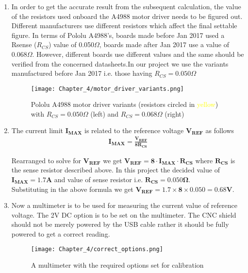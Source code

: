 \begin{enumerate}
    \item In order to get the accurate result from the subsequent calculation, the value of the resistors used onboard the A4988 motor driver needs to be figured out. Different manufacturers use different resistors which affect the final settable figure. In terms of Pololu A4988's, boards made before Jan 2017 used a Rsense ($R_{CS}$) value of 0.050$\Omega$, boards made after Jan 2017 use a value of 0.068$\Omega$. However, different boards use different values and the same should be verified from the concerned datasheets.In our project we use the variants manufactured before Jan 2017 i.e. those having $R_{CS} = 0.050\Omega$ 
    
    \begin{figure}[h]
    \centering
    \texttt{[image: Chapter\_4/motor\_driver\_variants.png]}
    \caption{Pololu A4988 motor driver variants (resistors circled in \textcolor{yellow}{yellow}) with  $R_{CS} = 0.050\Omega$ (left) and $R_{CS} = 0.068\Omega$ (right)}
    \label{fig:driver_variants}
    \end{figure}
    
    \item  The current limit $\boldsymbol{I_{MAX}}$ is related to the reference voltage $\boldsymbol{V_{REF}}$ as follows
            \begin{align}
               \boldsymbol{I_{MAX} = \frac{V_{REF}}{8R_{CS}}} \nonumber
            \end{align}

            Rearranged to solve for $\boldsymbol{V_{REF}}$ we get
            $ \boldsymbol{V_{REF} = 8 \cdot I_{MAX} \cdot R_{CS}}$  where $\boldsymbol{R_{CS}}$ is the sense resistor described above. In this project the decided value of $\boldsymbol{I_{MAX}= 1.7A}$  and value of sense resistor i.e. $\boldsymbol{R_{CS} = 0.050\Omega}$. \\
            Substituting in the above formula we get  $\boldsymbol{V_{REF} = 1.7\times8\times0.050 = 0.68V}$.

    \item  Now a multimeter is to be used for measuring the current value of reference voltage. The 2V DC option is to be set on the multimeter. The CNC shield should not be merely powered by the USB cable rather it should be fully powered to get a correct reading. 
    
    \begin{figure}[h]
        \centering
        \texttt{[image: Chapter\_4/correct\_options.png]}
        \caption{A multimeter with the required options set for calibration}
        \label{fig:correct_options}
    \end{figure}
 


\end{enumerate}
